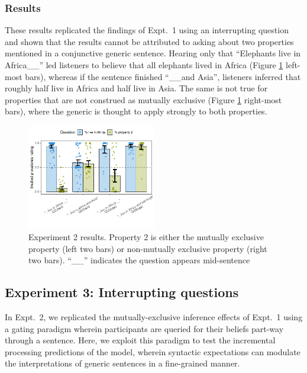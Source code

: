 \documentclass[10pt,letterpaper]{article}
\begin{document}

\subsubsection{Results}

These results replicated the findings of Expt.~1 using an interrupting question and shown that the results cannot be attributed to asking about two properties mentioned in a conjunctive generic sentence. Hearing only that ``Elephants live in Africa\_\_'' led listeners to believe that all elephants lived in Africa (Figure \ref{fig:expt2} left-most bars), whereas if the sentence finished ``\_\_and Asia'', listeners inferred that roughly half live in Africa and half live in Asia. The same is not true for properties that are not construed as mutually exclusive (Figure \ref{fig:expt2} right-most bars), where the generic is thought to apply strongly to both properties. 

\begin{figure}[h]
  \centering
    \includegraphics[width=0.5\textwidth]{expt2_summary}
  \caption{Experiment 2 results. Property 2 is either the mutually exclusive property (left two bars) or non-mutually exclusive property (right two bars). ``\_\_'' indicates the question appears mid-sentence}
  \label{fig:expt2}
  \end{figure}

\subsection{Experiment 3: Interrupting questions}

In Expt.~2, we replicated the mutually-exclusive inference effects of Expt.~1 using a gating paradigm wherein participants are queried for their beliefs part-way through a sentence. 
Here, we exploit this paradigm to test the incremental processing predictions of the model, wherein syntactic expectations can modulate the interpretations of generic sentences in a fine-grained manner. 
\end{document}
